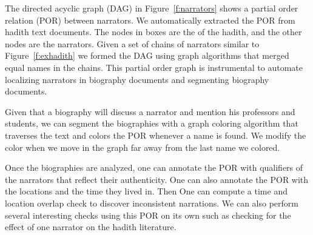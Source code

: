 \documentclass[12pt]{article}
\begin{document}
{\begin{figure}[tb]
\end{figure}

The directed acyclic graph (DAG) 
in Figure~\ref{f:narrators} shows a partial order relation (POR) between
narrators.
We automatically extracted the POR from hadith text 
documents.
The nodes in boxes are the  of the hadith, 
and the other nodes are the narrators.
Given a set of chains of narrators similar to 
Figure~\ref{f:exhadith} we formed the DAG using graph algorithms 
that merged equal names in the chains. 
This partial order graph is instrumental to automate
localizing narrators in biography documents and
segmenting biography documents.

Given that a biography will discuss a narrator and mention
his professors and students,
we can segment the biographies with a graph coloring algorithm 
that traverses the text and colors the POR whenever
a name is found. 
We modify the color when we move in the graph 
far away from the last name we colored.

Once the biographies are analyzed, one can annotate
the POR with qualifiers of the narrators that reflect
their authenticity. 
One can also annotate the POR with the locations and 
the time they lived in. 
Then One can compute a time and location overlap
check to discover inconsistent narrations.
We can also perform several interesting checks using 
this POR on its own such as checking for the effect of
one narrator on the hadith literature. 

}
\end{document}
